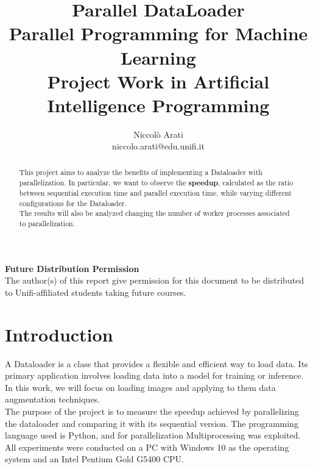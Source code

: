\documentclass[10pt,twocolumn,letterpaper]{article}
\begin{document}
\title{Parallel DataLoader\\
\large Parallel Programming for Machine Learning\\Project Work in Artificial Intelligence Programming}

\author{Niccolò Arati\\
niccolo.arati@edu.unifi.it\\
}

\maketitle
\thispagestyle{empty}

\begin{abstract}
This project aims to analyze the benefits of implementing a Dataloader with parallelization. In particular, we want to observe the \textbf{speedup}, calculated as the ratio between sequential execution time and parallel execution time, while varying different configurations for the Dataloader. \\
The results will also be analyzed changing the number of worker processes associated to parallelization.

\end{abstract}

\noindent\large\textbf{Future Distribution Permission}\\
\indent The author(s) of this report give permission for this document to be distributed to Unifi-affiliated students taking future courses.


\section{Introduction}
\label{sec:int}
A Dataloader is a class that provides a flexible and efficient way to load data. Its primary application involves loading data into a model for training or inference.\\
In this work, we will focus on loading images and applying to them data augmentation techniques.\\
The purpose of the project is to measure the speedup achieved by parallelizing the dataloader and comparing it with its sequential version. The programming language used is Python, and for parallelization Multiprocessing was exploited.\\
All experiments were conducted on a PC with Windows 10 as the operating system and an Intel Pentium Gold G5400 CPU.
\end{document}
